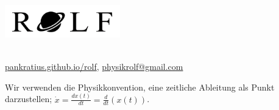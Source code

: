\documentclass[a4paper]{article}
\begin{document}
	\vspace*{-1cm}
	\parbox{4cm}{\vspace{-0.2cm}\includegraphics[width=5cm]{../images/rolfal.jpg}}
	\parbox{10.6cm}{ \\
			\url{pankratius.github.io/rolf},  \href{mailto:physikrolf@gmail.com}{physikrolf@gmail.com} \\ \vspace*{-.5cm} }
		\vspace{0.5cm}
		
		\thispagestyle{empty}
\begin{framed}
	\noindent
		\small
		Wir verwenden die Physikkonvention, eine zeitliche Ableitung als Punkt darzustellen; $\dot{x} = \frac{dx\left(t\right)}{dt} = \frac{d}{dt}\left(x\left(t\right)\right)$.
\end{framed}

\noindent





\end{document}
